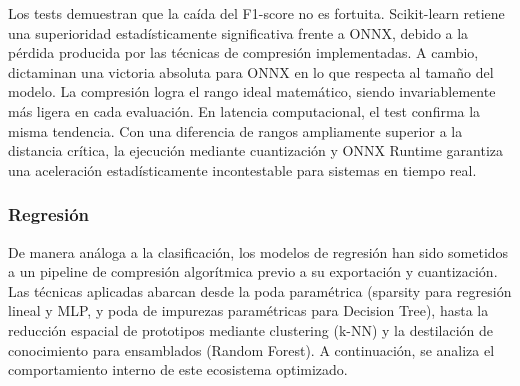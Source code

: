 \documentclass[a4paper,12pt,twoside,final]{book}
\begin{document}
Los tests demuestran que la caída del F1-score no es fortuita. Scikit-learn retiene una superioridad estadísticamente
significativa frente a ONNX, debido a la pérdida producida por las técnicas de compresión implementadas. A cambio,
dictaminan una victoria absoluta para ONNX en lo que respecta al tamaño del modelo. La compresión logra el rango ideal
matemático, siendo invariablemente más ligera en cada evaluación. En latencia computacional, el test confirma la misma
tendencia. Con una diferencia de rangos ampliamente superior a la distancia crítica, la ejecución mediante cuantización
y ONNX Runtime garantiza una aceleración estadísticamente incontestable para sistemas en tiempo real.

\subsubsection{Regresión}
De manera análoga a la clasificación, los modelos de regresión han sido sometidos a un pipeline de compresión algorítmica
previo a su exportación y cuantización. Las técnicas aplicadas abarcan desde la poda paramétrica (sparsity para regresión
lineal y MLP, y poda de impurezas paramétricas para Decision Tree), hasta la reducción espacial de prototipos mediante
clustering (k-NN) y la destilación de conocimiento para ensamblados (Random Forest). A continuación, se analiza el
comportamiento interno de este ecosistema optimizado.
\end{document}
